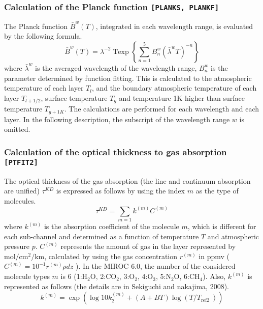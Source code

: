 \hypertarget{calculation-of-the-planck-function-planks-plankf}{%
\subsubsection{\texorpdfstring{Calculation of the Planck function
\texttt{{[}PLANKS,\ PLANKF{]}}}{Calculation of the Planck function {[}PLANKS, PLANKF{]}}}\label{calculation-of-the-planck-function-planks-plankf}}

The Planck function \(\bar{B}^{w}(T)\), integrated in each wavelength
range, is evaluated by the following formula. \begin{equation}
\bar{B}^{w}(T)=\lambda^{-2} \operatorname{Texp}\left\{\sum_{n=1}^{5} B_{n}^{w}\left(\bar{\lambda}^{w} T\right)^{-n}\right\}
\end{equation} where \(\bar{\lambda}^{w}\) is the averaged wavelength of the
wavelength range, \(B_{n}^{w}\) is the parameter determined by function
fitting. This is calculated to the atmospheric temperature of each layer
\(T_l\), and the boundary atmospheric temperature of each layer
\(T_{l+1/2}\), surface temperature \(T_g\) and temperature 1K higher
than surface temperature \(T_{g+1K}\). The calculations are performed
for each wavelength and each layer. In the following description, the
subscript of the wavelength range \(w\) is omitted.

\hypertarget{calculation-of-the-optical-thickness-to-gas-absorption-ptfit2}{%
\subsubsection{\texorpdfstring{Calculation of the optical thickness to
gas absorption
\texttt{{[}PTFIT2{]}}}{Calculation of the optical thickness to gas absorption {[}PTFIT2{]}}}\label{calculation-of-the-optical-thickness-to-gas-absorption-ptfit2}}

The optical thickness of the gas absorption (the line and continuum
absorption are unified) \(\tau^{K D}\) is expressed as follows by using
the index \(m\) as the type of molecules. \begin{equation}
\tau^{KD}=\sum_{m=1} k^{(m)} C^{(m)}
\end{equation} where \(k^{(m)}\) is the absorption coefficient of the molecule
\(m\), which is different for each sub-channel and determined as a
function of temperature \(T\) and atmospheric pressure \(p\).
\(C^{(m)}\) represents the amount of gas in the layer represented by
\(\mathrm{mol} / \mathrm{cm}^{2} / \mathrm{km}\), calculated by using
the gas concentration \(r^{(m)}\) in ppmv (
\(C^{(m)}=10^{-1} r^{(m)} \rho d z\) ). In the MIROC 6.0, the number of
the considered molecule types \(m\) is 6
(1:\(\mathrm{H}_{2} \mathrm{O}\), 2:\(\mathrm{C}\mathrm{O}_{2}\),
3:\(\mathrm{O}_{2}\), 4:\(\mathrm{O}_{3}\),
5:\(\mathrm{N}_{2} \mathrm{O}\), 6:\(\mathrm{C}\mathrm{H}_{4}\)). Also,
\(k^{(m)}\) is represented as follows (the details are in Sekiguchi and
nakajima, 2008). \begin{equation}
k^{(m)}=\exp \left(\log 10 k_{2}^{(m)}+(A+B T) \log \left(T / T_{\text {ref2 } }\right)\right)
\end{equation}

